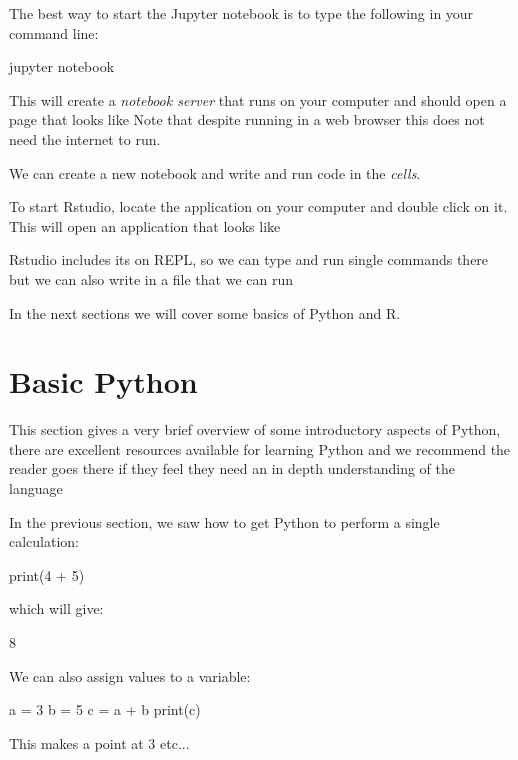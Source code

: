 The best way to start the Jupyter notebook is to type the following in your
command line:

\begin{cliin}
jupyter notebook
\end{cliin}

This will create a \textit{notebook server} that runs on your computer and
should open a page that looks like %
Note that despite running in a web browser this does not need the internet to
run.

We can create a new notebook and write and run code in the \textit{cells}.

To start Rstudio, locate the application on your computer and double click on
it. This will open an application that looks like %

Rstudio includes its on REPL, so we can type and run single commands there but
we can also write in a file that we can run

In the next sections we will cover some basics of Python and R.

\section{Basic Python}\label{sec:basic-python}

This section gives a very brief overview of some introductory aspects of Python,
there are excellent resources available for learning Python and we recommend the
reader goes there if they feel they need an in depth understanding of the
language %

In the previous section, we saw how to get Python to perform a single
calculation:

\begin{pyin}
print(4 + 5)
\end{pyin}

which will give:

\begin{pyout}
8
\end{pyout}

We can also assign values to a variable:

\begin{pyin}
a = 3
b = 5
c = a + b
print(c)
\end{pyin}

\begin{explanation}
This makes a point at 3 etc...  %
\end{explanation}

